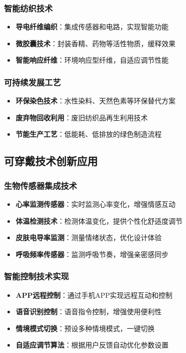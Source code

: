 \documentclass[12pt,UTF8]{ctexbook}
\begin{document}
\subsubsection{智能纺织技术}
\begin{itemize}[leftmargin=2cm]
	\item \textbf{导电纤维编织}：集成传感器和电路，实现智能功能
	\item \textbf{微胶囊技术}：封装香精、药物等活性物质，缓释效果
	\item \textbf{智能响应纤维}：环境响应型纤维，自适应调节性能
\end{itemize}

\subsubsection{可持续发展工艺}
\begin{itemize}[leftmargin=2cm]
	\item \textbf{环保染色技术}：水性染料、天然色素等环保替代方案
	\item \textbf{废弃物回收利用}：废旧纺织品再生利用技术
	\item \textbf{节能生产工艺}：低能耗、低排放的绿色制造流程
\end{itemize}

\subsection{可穿戴技术创新应用}
\subsubsection{生物传感器集成技术}
\begin{itemize}[leftmargin=2cm]
	\item \textbf{心率监测传感器}：实时监测心率变化，增强情感互动
	\item \textbf{体温检测技术}：检测体温变化，提供个性化舒适度调节
	\item \textbf{皮肤电导率监测}：测量情绪状态，优化设计体验
	\item \textbf{呼吸频率传感器}：监测呼吸节奏，增强亲密感同步
\end{itemize}

\subsubsection{智能控制技术实现}
\begin{itemize}[leftmargin=2cm]
	\item \textbf{APP远程控制}：通过手机APP实现远程互动和控制
	\item \textbf{语音识别控制}：语音指令控制，增强使用便利性
	\item \textbf{情境模式切换}：预设多种情境模式，一键切换
	\item \textbf{自适应调节算法}：根据用户反馈自动优化参数设置
\end{itemize}
\end{document}

